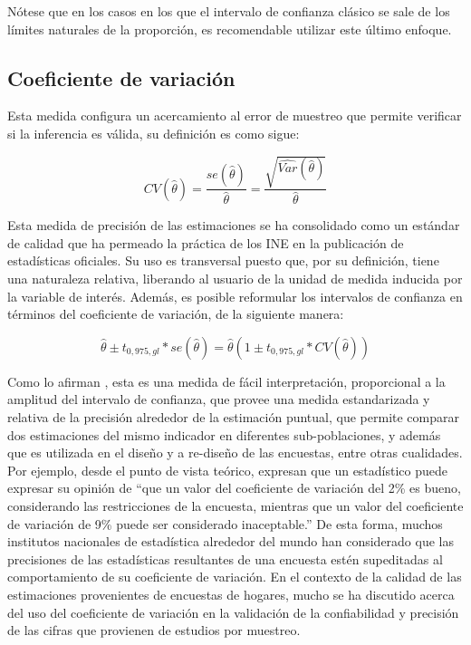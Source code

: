 \documentclass[
  12pt,
]{book}
\begin{document}
Nótese que en los casos en los que el intervalo de confianza clásico se sale de los límites naturales de la proporción, es recomendable utilizar este último enfoque.

\hypertarget{coeficiente-de-variaciuxf3n}{%
\subsection{Coeficiente de variación}\label{coeficiente-de-variaciuxf3n}}

Esta medida configura un acercamiento al error de muestreo que permite verificar si la inferencia es válida, su definición es como sigue:

\[
CV(\hat\theta) = \frac{se(\hat\theta)}{\hat\theta} = \frac{\sqrt{\widehat{Var}(\hat\theta)}}{\hat\theta}
\]

Esta medida de precisión de las estimaciones se ha consolidado como un estándar de calidad que ha permeado la práctica de los INE en la publicación de estadísticas oficiales. Su uso es transversal puesto que, por su definición, tiene una naturaleza relativa, liberando al usuario de la unidad de medida inducida por la variable de interés. Además, es posible reformular los intervalos de confianza en términos del coeficiente de variación, de la siguiente manera:

\[
\hat\theta \pm t_{0,975, gl} * se(\hat\theta) = \hat\theta  \left(1 \pm t_{0,975, gl} * CV(\hat\theta)\right)
\]

Como lo afirman \citet{Singh_Westlake_Feder_2004}, esta es una medida de fácil interpretación, proporcional a la amplitud del intervalo de confianza, que provee una medida estandarizada y relativa de la precisión alrededor de la estimación puntual, que permite comparar dos estimaciones del mismo indicador en diferentes sub-poblaciones, y además que es utilizada en el diseño y a re-diseño de las encuestas, entre otras cualidades. Por ejemplo, desde el punto de vista teórico, \citet{Sarndal_Swensson_Wretman_2003} expresan que un estadístico puede expresar su opinión de ``que un valor del coeficiente de variación del 2\% es bueno, considerando las restricciones de la encuesta, mientras que un valor del coeficiente de variación de 9\% puede ser considerado inaceptable.'' De esta forma, muchos institutos nacionales de estadística alrededor del mundo han considerado que las precisiones de las estadísticas resultantes de una encuesta estén supeditadas al comportamiento de su coeficiente de variación. En el contexto de la calidad de las estimaciones provenientes de encuestas de hogares, mucho se ha discutido acerca del uso del coeficiente de variación en la validación de la confiabilidad y precisión de las cifras que provienen de estudios por muestreo.
\end{document}

